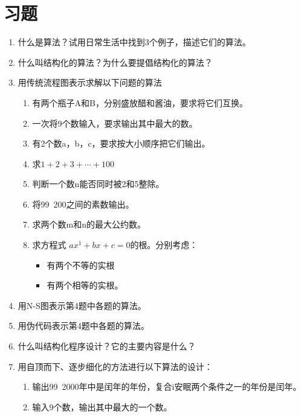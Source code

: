 \section{习题}
\begin{enumerate}
	\item 什么是算法？试用日常生活中找到3个例子，描述它们的算法。
	\item 什么叫结构化的算法？为什么要提倡结构化的算法？
	\item 用传统流程图表示求解以下问题的算法
		\begin{enumerate}
			\item 有两个瓶子A和B，分别盛放醋和酱油，要求将它们互换。
			\item 一次将9个数输入，要求输出其中最大的数。
			\item 有2个数a，b，c，要求按大小顺序把它们输出。
			\item 求$1 + 2 + 3 + \cdots + 100$
			\item 判断一个数n能否同时被2和5整除。
			\item 将99~200之间的素数输出。
			\item 求两个数m和n的最大公约数。
			\item 求方程式 $ax^1 + bx + c = 0$的根。分别考虑：
				\begin{itemize}
					\item 有两个不等的实根
					\item 有两个相等的实根。
				\end{itemize}
		\end{enumerate}
	\item 用N-S图表示第4题中各题的算法。
	\item 用伪代码表示第4题中各题的算法。
	\item 什么叫结构化程序设计？它的主要内容是什么？
	\item 用自顶而下、逐步细化的方法进行以下算法的设计：
		\begin{enumerate}
			\item 输出99~2000年中是闰年的年份，复合i安眠两个条件之一的年份是闰年。
			\item 输入9个数，输出其中最大的一个数。
		\end{enumerate}
\end{enumerate}
